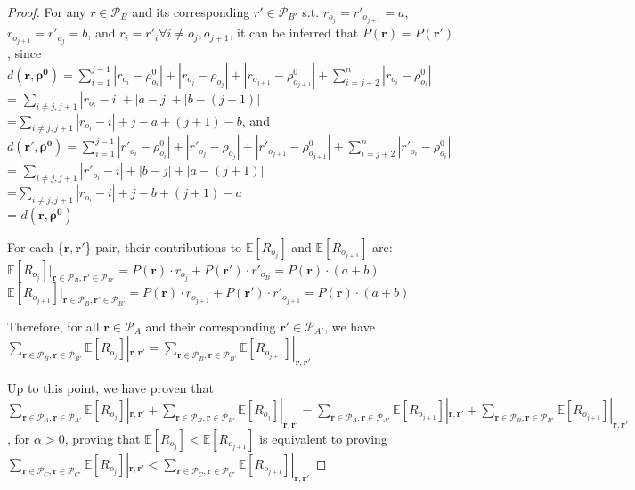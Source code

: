 \documentclass[11pt, oneside]{article}   	%
\begin{document}
\begin{proof}
For any $r \in \mathcal{P}_B$ and its corresponding $r' \in \mathcal{P}_{B'}$ s.t. $r_{o_j} = r'_{o_{j+1}} = a$, $r_{o_{j+1}} = r'_{o_{j}} = b$, and $r_i = r'_i \forall i\neq o_j, o_{j+1}$, it can be inferred that $P(\bm{r}) = P(\bm{r'})$, since \\
$d(\bm{r}, \bm{\rho^0}) = \sum\limits_{i=1}^{j-1}|r_{o_i} - \rho^0_{o_i}| + |r_{o_j} - \rho_{o_j}| + |r_{o_{j+1}} - \rho^0_{o_{j+1}}| + \sum\limits_{i = j+2}^{n}|r_{o_i} - \rho^0_{o_{i}}|$ \\
= $\sum\limits_{i \neq j, j+1} |r_{o_i} - i| + |a-j| + |b - (j+1)|$\\
=$\sum\limits_{i \neq j, j+1} |r_{o_i} - i| + j-a + (j+1)-b$, and \\

$d(\bm{r'}, \bm{\rho^0}) = \sum\limits_{i=1}^{j-1}|r'_{o_i} - \rho^0_{o_i}| + |r'_{o_j} - \rho_{o_j}| + |r'_{o_{j+1}} - \rho^0_{o_{j+1}}| + \sum\limits_{i = j+2}^{n}|r'_{o_i} - \rho^0_{o_{i}}|$ \\
= $\sum\limits_{i \neq j, j+1} |r'_{o_i} - i| + |b-j| + |a - (j+1)|$\\
=$\sum\limits_{i \neq j, j+1} |r_{o_i} - i| + j-b + (j+1)- a$ \\
= $d(\bm{r}, \bm{\rho^0}) $

For each \{$\bm{r}, \bm{r'}$\} pair, their contributions to $\mathbb{E}[R_{o_j}]$ and $\mathbb{E}[R_{o_{j+1}}]$ are: \\
$\mathbb{E}[R_{o_j}]|_{\bm{r}\in \mathcal{P}_B,\bm{r'}\in \mathcal{P}_{B'}} = P(\bm{r})\cdot r_{o_j} + P(\bm{r'})\cdot r'_{o_B} = P(\bm{r})\cdot (a+b) $ \\

$\mathbb{E}[R_{o_{j+1}}]|_{\bm{r}\in \mathcal{P}_B,\bm{r'}\in \mathcal{P}_{B'}} = P(\bm{r})\cdot r_{o_{j+1}} + P(\bm{r'})\cdot r'_{o_{j+1}} = P(\bm{r})\cdot (a+b)$ 

Therefore, for all $\bm{r}\in \mathcal{P}_A$ and their corresponding $\bm{r'}\in \mathcal{P}_{A'}$, we have \\
$\sum\limits_{\bm{r}\in \mathcal{P}_B, \bm{r}\in \mathcal{P}_{B'}}\mathbb{E}[R_{o_j}] |_{\bm{r}, \bm{r'}} = \sum\limits_{\bm{r}\in \mathcal{P}_B, \bm{r}\in \mathcal{P}_{B'}}\mathbb{E}[R_{o_{j+1}}] |_{\bm{r}, \bm{r'}}$

Up to this point, we have proven that \\
$\sum\limits_{\bm{r}\in \mathcal{P}_A, \bm{r}\in \mathcal{P}_{A'}}\mathbb{E}[R_{o_j}] |_{\bm{r}, \bm{r'}} + \sum\limits_{\bm{r}\in \mathcal{P}_B, \bm{r}\in \mathcal{P}_{B'}}\mathbb{E}[R_{o_j}] |_{\bm{r}, \bm{r'}}= \sum\limits_{\bm{r}\in \mathcal{P}_A, \bm{r}\in \mathcal{P}_{A'}}\mathbb{E}[R_{o_{j+1}}] |_{\bm{r}, \bm{r'}}+\sum\limits_{\bm{r}\in \mathcal{P}_B, \bm{r}\in \mathcal{P}_{B'}}\mathbb{E}[R_{o_{j+1}}] |_{\bm{r}, \bm{r'}}$,
for $\alpha > 0$, proving that $\mathbb{E}[R_{o_j}] < \mathbb{E}[R_{o_{j+1}}]$ is equivalent to proving \\
$\sum\limits_{\bm{r}\in \mathcal{P}_C, \bm{r}\in \mathcal{P}_{C'}}\mathbb{E}[R_{o_j}] |_{\bm{r}, \bm{r'}} < \sum\limits_{\bm{r}\in \mathcal{P}_C, \bm{r}\in \mathcal{P}_{C'}}\mathbb{E}[R_{o_{j+1}}] |_{\bm{r}, \bm{r'}}$



\end{proof}
\end{document}
